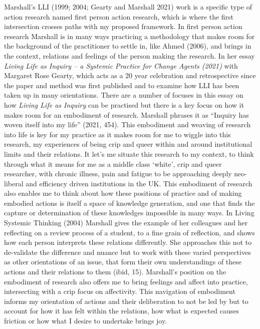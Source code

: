 Marshall's LLI (1999; 2004; Gearty and Marshall 2021) work is a specific
type of action research named first person action research, which is
where the first intersection crosses paths with my proposed framework.
In first person action research Marshall is in many ways practicing a
methodology that makes room for the background of the practitioner to
settle in, like Ahmed (2006), and brings in the context, relations and
feelings of the person making the research. In her essay \emph{Living
Life as Inquiry -- a Systemic Practice for Change Agents (2021)} with
Margaret Rose Gearty, which acts as a 20 year celebration and
retrospective since the paper and method was first published and to
examine how LLI has been taken up in many orientations. There are a
number of focuses in this essay on how \emph{Living Life as Inquiry} can
be practised but there is a key focus on how it makes room for an
embodiment of research. Marshall phrases it as ``Inquiry has woven
itself into my life'' (2021, 454). This embodiment and weaving of
research into life is key for my practice as it makes room for me to
wiggle into this research, my experiences of being crip and queer within
and around institutional limits and their relations. It let's me situate
this research to my context, to think through what it means for me as a
middle class `white', crip and queer researcher, with chronic illness,
pain and fatigue to be approaching deeply neo-liberal and efficiency
driven institutions in the UK. This embodiment of research also enables
me to think about how these positions of practice and of making embodied
actions is itself a space of knowledge generation, and one that finds
the capture or determination of these knowledges impossible in many
ways. In Living Systemic Thinking (2004) Marshall gives the example of
her colleagues and her reflecting on a review process of a student, to a
fine grain of reflection, and shows how each person interprets these
relations differently. She approaches this not to de-validate the
difference and nuance but to work with these varied perspectives as
other orientations of an issue, that form their own understandings of
these actions and their relations to them (ibid, 15). Marshall's
position on the embodiment of research also offers me to bring feelings
and affect into practice, intersecting with a crip focus on affectivity.
This navigation of embodiment informs my orientation of actions and
their deliberation to not be led by but to account for how it has felt
within the relations, how what is expected causes friction or how what I
desire to undertake brings joy.

